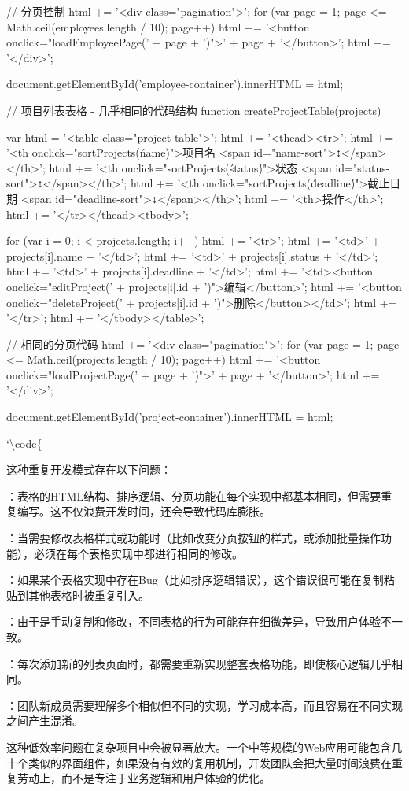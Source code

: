 \begin{itemize}
{{    // 分页控制
    html += '<div class="pagination">';
    for (var page = 1; page <= Math.ceil(employees.length / 10); page++) {
      html += '<button onclick="loadEmployeePage(' + page + ')">' + page + '</button>';
    }
    html += '</div>';

    document.getElementById('employee-container').innerHTML = html;
  }

  // 项目列表表格 - 几乎相同的代码结构
  function createProjectTable(projects) {
    var html = '<table class="project-table">';
    html += '<thead><tr>';
    html += '<th onclick="sortProjects(\'name\')">项目名 <span id="name-sort">↕</span></th>';
    html += '<th onclick="sortProjects(\'status\')">状态 <span id="status-sort">↕</span></th>';
    html += '<th onclick="sortProjects(\'deadline\')">截止日期 <span id="deadline-sort">↕</span></th>';
    html += '<th>操作</th>';
    html += '</tr></thead><tbody>';

    for (var i = 0; i < projects.length; i++) {
      html += '<tr>';
      html += '<td>' + projects[i].name + '</td>';
      html += '<td>' + projects[i].status + '</td>';
      html += '<td>' + projects[i].deadline + '</td>';
      html += '<td><button onclick="editProject(' + projects[i].id + ')">编辑</button>';
      html += '<button onclick="deleteProject(' + projects[i].id + ')">删除</button></td>';
      html += '</tr>';
    }
    html += '</tbody></table>';

    // 相同的分页代码
    html += '<div class="pagination">';
    for (var page = 1; page <= Math.ceil(projects.length / 10); page++) {
      html += '<button onclick="loadProjectPage(' + page + ')">' + page + '</button>';
    }
    html += '</div>';

    document.getElementById('project-container').innerHTML = html;
  }
  }`\textbackslash code\{

  这种重复开发模式存在以下问题：

  ：表格的HTML结构、排序逻辑、分页功能在每个实现中都基本相同，但需要重复编写。这不仅浪费开发时间，还会导致代码库膨胀。

  ：当需要修改表格样式或功能时（比如改变分页按钮的样式，或添加批量操作功能），必须在每个表格实现中都进行相同的修改。

  ：如果某个表格实现中存在Bug（比如排序逻辑错误），这个错误很可能在复制粘贴到其他表格时被重复引入。

  ：由于是手动复制和修改，不同表格的行为可能存在细微差异，导致用户体验不一致。

  ：每次添加新的列表页面时，都需要重新实现整套表格功能，即使核心逻辑几乎相同。

  ：团队新成员需要理解多个相似但不同的实现，学习成本高，而且容易在不同实现之间产生混淆。

  这种低效率问题在复杂项目中会被显著放大。一个中等规模的Web应用可能包含几十个类似的界面组件，如果没有有效的复用机制，开发团队会把大量时间浪费在重复劳动上，而不是专注于业务逻辑和用户体验的优化。
\end{itemize}

